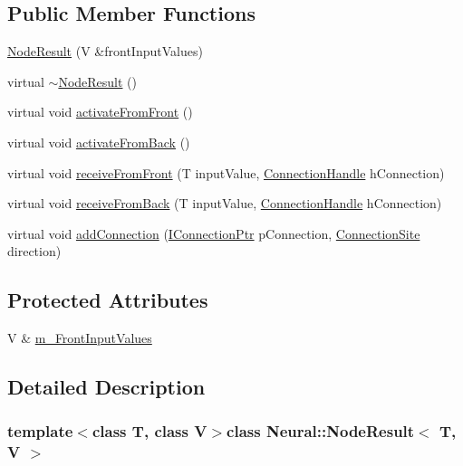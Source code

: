 \subsection*{Public Member Functions}
\begin{DoxyCompactItemize}
\item 
\hyperlink{class_neural_1_1_node_result_a8f37d7c3fb4a69576482431a54c00181}{NodeResult} (V \&frontInputValues)
\item 
virtual \hyperlink{class_neural_1_1_node_result_a975d911f4be3ec90ab65e198955ff210}{$\sim$NodeResult} ()
\item 
virtual void \hyperlink{class_neural_1_1_node_result_a15262168019626591b80dbb9136bc129}{activateFromFront} ()
\item 
virtual void \hyperlink{class_neural_1_1_node_result_a8666fda8bcd8abe7aa1f60d2ce5ba7cd}{activateFromBack} ()
\item 
virtual void \hyperlink{class_neural_1_1_node_result_afd1b253dbb0645b3ae0523ebd37b8d1e}{receiveFromFront} (T inputValue, \hyperlink{namespace_neural_a73b2763d14999ad4308dbf4246aa503f}{ConnectionHandle} hConnection)
\item 
virtual void \hyperlink{class_neural_1_1_node_result_a1deab1f035caeb6a4ace28253bea2211}{receiveFromBack} (T inputValue, \hyperlink{namespace_neural_a73b2763d14999ad4308dbf4246aa503f}{ConnectionHandle} hConnection)
\item 
virtual void \hyperlink{class_neural_1_1_node_result_afab338fad3978f3ec8f088189377ff97}{addConnection} (\hyperlink{class_neural_1_1_i_node_a5243be0a422bcddc5a71a79920d09fd1}{IConnectionPtr} pConnection, \hyperlink{namespace_neural_add871cb0324e8abfb693026afba3a621}{ConnectionSite} direction)
\end{DoxyCompactItemize}
\subsection*{Protected Attributes}
\begin{DoxyCompactItemize}
\item 
V \& \hyperlink{class_neural_1_1_node_result_a0e716a846ada58725eda17370bed5a93}{m\_\-FrontInputValues}
\end{DoxyCompactItemize}


\subsection{Detailed Description}
\subsubsection*{template$<$class T, class V$>$class Neural::NodeResult$<$ T, V $>$}



